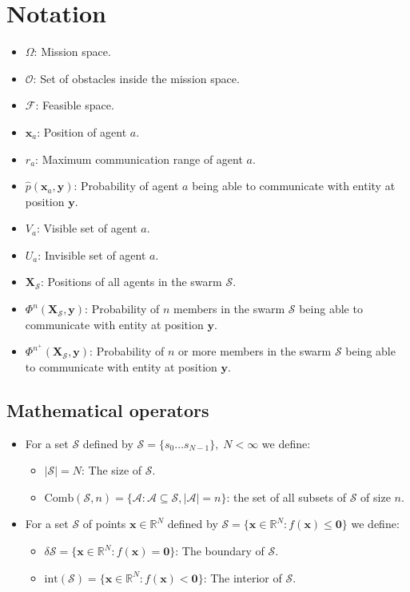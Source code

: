 \section{Notation}
\begin{itemize}
  \item $\Omega$: Mission space.
  \item $\mathcal{O}$: Set of obstacles inside the mission space.
  \item $\mathcal{F}$: Feasible space.
  \item $\mathbf{x}_{a}$: Position of agent $a$.
  \item $r_{a}$: Maximum communication range of agent $a$.
  \item $\hat{p}(\mathbf{x}_{a}, \mathbf{y})$: Probability of agent $a$ being able to communicate with entity at position $\mathbf{y}$.
  \item $V_{a}$: Visible set of agent $a$.
  \item $U_{a}$: Invisible set of agent $a$.
  \item $\mathbf{X}_{\mathcal{S}}$: Positions of all agents in the swarm $\mathcal{S}$.
  \item $\Phi^{n}(\mathbf{X_{\mathcal{S}}}, \mathbf{y})$: Probability of $n$ members in the swarm $\mathcal{S}$ being able to communicate with entity at position $\mathbf{y}$.
  \item $\Phi^{n^{+}}(\mathbf{X_{\mathcal{S}}}, \mathbf{y})$: Probability of $n$ or more members in the swarm $\mathcal{S}$ being able to communicate with entity at position $\mathbf{y}$.
\end{itemize}

\subsection{Mathematical operators}
\begin{itemize}
  \item For a set $\mathcal{S}$ defined by $\mathcal{S} = \{s_{0}\hdots s_{N-1}\},\;N<\infty$ we define:
  \begin{itemize}
    \item $|\mathcal{S}| = N$: The size of $\mathcal{S}$.
    \item $\mathrm{Comb}(\mathcal{S}, n) = \{\mathcal{A}: \mathcal{A}\subseteq\mathcal{S}, |\mathcal{A}|=n\}$: the set of all subsets of $\mathcal{S}$ of size $n$.
  \end{itemize}
  \item For a set $\mathcal{S}$ of points $\mathbf{x}\in\mathbb{R}^{N}$ defined by $\mathcal{S} = \{\mathbf{x}\in\mathbb{R}^{N}: f(\mathbf{x})\leq\mathbf{0}\}$ we define:
  \begin{itemize}
    \item $\delta\mathcal{S} = \{\mathbf{x}\in\mathbb{R}^{N}: f(\mathbf{x}) = \mathbf{0}\}$: The boundary of $\mathcal{S}$.
    \item $\mathrm{int}(\mathcal{S}) = \{\mathbf{x}\in\mathbb{R}^{N}: f(\mathbf{x}) < \mathbf{0}\}$: The interior of $\mathcal{S}$.
  \end{itemize}
\end{itemize}